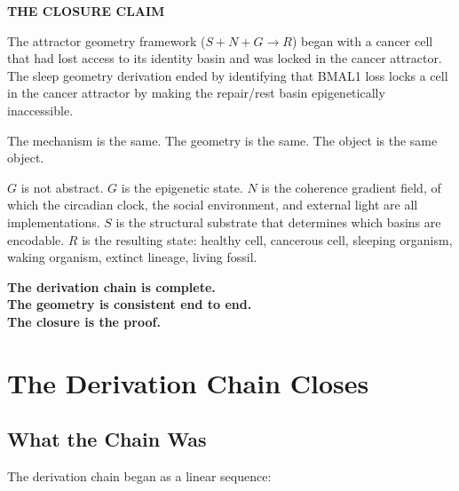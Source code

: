 \documentclass[10pt, a4paper]{article}
\begin{document}
\vspace{0.8em}

\begin{mdframed}[backgroundcolor=claimbox,
  linecolor=claimbox,linewidth=0pt,
  innertopmargin=0.7em,innerbottommargin=0.7em,
  innerleftmargin=1.0em,innerrightmargin=1.0em]
\color{white}
\textbf{THE CLOSURE CLAIM}

\medskip
The attractor geometry framework
($S + N + G \rightarrow R$) began with
a cancer cell that had lost access to
its identity basin and was locked in the
cancer attractor. The sleep geometry
derivation ended by identifying that
BMAL1 loss locks a cell in the cancer
attractor by making the repair/rest
basin epigenetically inaccessible.

\medskip
The mechanism is the same.
The geometry is the same.
The object is the same object.

\medskip
$G$ is not abstract. $G$ is the
epigenetic state. $N$ is the coherence
gradient field, of which the circadian
clock, the social environment, and
external light are all implementations.
$S$ is the structural substrate that
determines which basins are encodable.
$R$ is the resulting state: healthy
cell, cancerous cell, sleeping organism,
waking organism, extinct lineage,
living fossil.

\medskip
\textbf{The derivation chain is
complete.\\
The geometry is consistent
end to end.\\
The closure is the proof.}
\end{mdframed}

\vspace{1em}

\section{The Derivation Chain Closes}
\label{sec:closure}

\subsection{What the Chain Was}

The derivation chain began as a linear
sequence:
\end{document}
